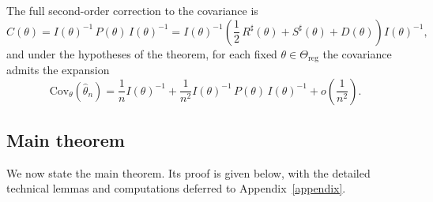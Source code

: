\documentclass[11pt,letterpaper]{amsart}
\numberwithin{equation}{section}
\theoremstyle{plain}
\theoremstyle{definition}
\theoremstyle{remark}
\begin{document}
The full second-order correction to the covariance is
\begin{equation*}
C(\theta)
=
I(\theta)^{-1}
\,P(\theta)\,
I(\theta)^{-1}
=
I(\theta)^{-1}
\left(
\frac12\,R^\sharp(\theta)+S^\sharp(\theta)+D(\theta)
\right)
I(\theta)^{-1},
\end{equation*}
and under the hypotheses of the theorem, for each fixed \(\theta\in\Theta_{\mathrm{reg}}\) the covariance admits the expansion
\begin{equation*}
\mathrm{Cov}_\theta(\hat\theta_n)
=
\frac{1}{n}I(\theta)^{-1}
+
\frac{1}{n^2}
I(\theta)^{-1}
\,P(\theta)\,
I(\theta)^{-1}
+
o\!\left(\frac{1}{n^2}\right).
\end{equation*}

\subsection{Main theorem}

We now state the main theorem. Its proof is given below, with the detailed technical lemmas and computations deferred to Appendix~\ref{appendix}.
\end{document}
